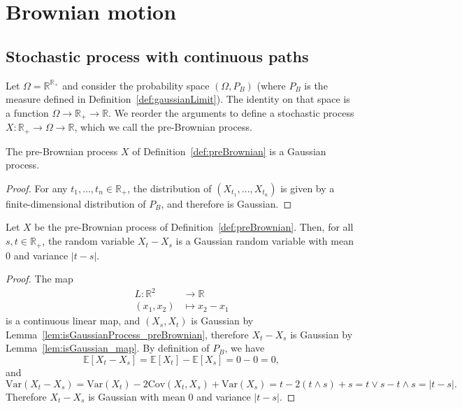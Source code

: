 \chapter{Brownian motion}
\label{chap:brownian}


\section{Stochastic process with continuous paths}

\begin{definition}\label{def:preBrownian}
  \leanok
Let $\Omega = \mathbb{R}^{\mathbb{R}_+}$ and consider the probability space $(\Omega, P_B)$ (where $P_B$ is the measure defined in Definition~\ref{def:gaussianLimit}).
The identity on that space is a function $\Omega \to \mathbb{R}_+ \to \mathbb{R}$.
We reorder the arguments to define a stochastic process $X : \mathbb{R}_+ \to \Omega \to \mathbb{R}$, which we call the pre-Brownian process.
\end{definition}


\begin{lemma}\label{lem:isGaussianProcess_preBrownian}
  \leanok
  The pre-Brownian process $X$ of Definition~\ref{def:preBrownian} is a Gaussian process.
\end{lemma}

\begin{proof}\leanok
For any $t_1, \ldots, t_n \in \mathbb{R}_+$, the distribution of $(X_{t_1}, \ldots, X_{t_n})$ is given by a finite-dimensional distribution of $P_B$, and therefore is Gaussian.
\end{proof}


\begin{lemma}\label{lem:map_sub_preBrownian}
  \leanok
Let $X$ be the pre-Brownian process of Definition~\ref{def:preBrownian}.
Then, for all $s, t \in \mathbb{R}_+$, the random variable $X_t - X_s$ is a Gaussian random variable with mean $0$ and variance $|t - s|$.
\end{lemma}

\begin{proof}\leanok
The map
\begin{align*}
  L : \mathbb{R}^2 &\to \mathbb{R} \\
  (x_1, x_2) &\mapsto x_2 - x_1
\end{align*}
is a continuous linear map, and $(X_s, X_t)$ is Gaussian by Lemma~\ref{lem:isGaussianProcess_preBrownian}, therefore $X_t - X_s$ is Gaussian by Lemma~\ref{lem:isGaussian_map}. By definition of $P_B$, we have
$$\mathbb{E}[X_t - X_s] = \mathbb{E}[X_t] - \mathbb{E}[X_s] = 0 - 0 = 0,$$
and
$$\mathrm{Var}(X_t - X_s) = \mathrm{Var}(X_t) - 2\mathrm{Cov}(X_t, X_s) + \mathrm{Var}(X_s) = t - 2(t \land s) + s = t \lor s - t \land s = |t - s|.$$
Therefore $X_t - X_s$ is Gaussian with mean $0$ and variance $|t - s|$.
\end{proof}


